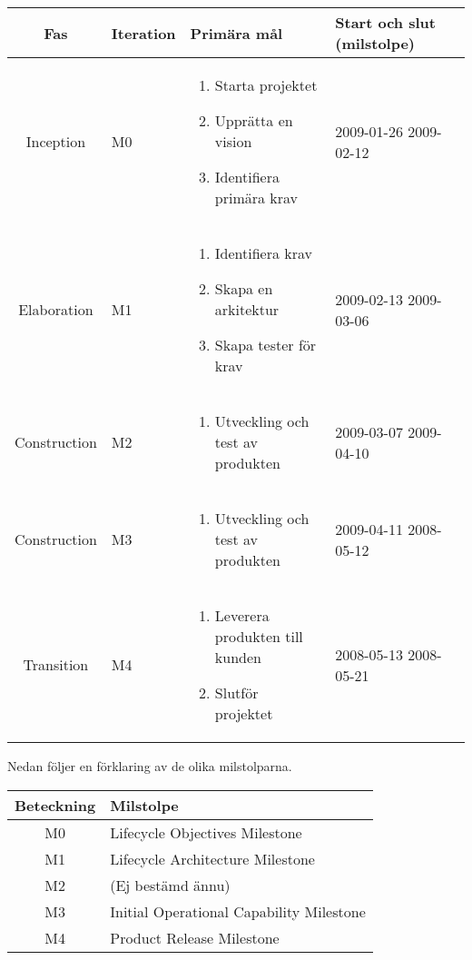\begin{center}
	\begin{tabular}{| c | m{1.5cm} | m{5cm} | m{2.5cm} | m{2cm} |}
		\hline
		\textbf{Fas} & \textbf{Iteration} & \textbf{Primära mål} & \textbf{Start och slut (milstolpe)} \\
		\hline
		Inception & M0 & \begin{enumerate} \item Starta projektet \item Upprätta en vision \item Identifiera primära krav \end{enumerate} & 2009-01-26 2009-02-12 \\
		\hline
		Elaboration & M1 & \begin{enumerate} \item Identifiera krav \item Skapa en arkitektur \item Skapa tester för krav \end{enumerate} & 2009-02-13 2009-03-06 \\
		\hline
		Construction & M2 & \begin{enumerate} \item Utveckling och test av produkten \end{enumerate} & 2009-03-07 2009-04-10 \\
		\hline
		Construction & M3 & \begin{enumerate} \item Utveckling och test av produkten \end{enumerate} & 2009-04-11 2008-05-12 \\
		\hline
		Transition & M4 & \begin{enumerate} \item Leverera produkten till kunden \item Slutför projektet \end{enumerate} & 2008-05-13 2008-05-21 \\
		\hline
	\end{tabular}
\end{center}

\emph{ }\linebreak
Nedan följer en förklaring av de olika milstolparna.

\begin{center}
	\begin{tabular}{| c | l |}
		\hline
		Beteckning & Milstolpe \\
		\hline
		M0 & Lifecycle Objectives Milestone \\
		\hline
		M1 & Lifecycle Architecture Milestone \\
		\hline
		M2 & (Ej bestämd ännu) \\
		\hline
		M3 & Initial Operational Capability Milestone \\
		\hline
		M4 & Product Release Milestone \\
		\hline
	\end{tabular}
\end{center}

